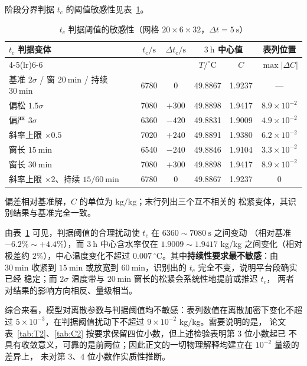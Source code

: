 \documentclass[12pt,a4paper]{ctexart}
\begin{document}
阶段分界判据 $t_c$ 的阈值敏感性见表~\ref{tab:app_tc}。

\begin{table}[H]
\centering
\small
\begin{tabular}{lccccc}
\toprule
$t_c$ 判据变体 & $t_c/\mathrm{s}$ & $\Delta t_c/\mathrm{s}$ &
\multicolumn{2}{c}{$3\ \mathrm{h}$ 中心值} & \multicolumn{1}{c}{表列位置} \\
\cmidrule(lr){4-5}\cmidrule(lr){6-6}
 & & & $T/^\circ\mathrm{C}$ & $C$ & $\max|\Delta C|$ \\
\midrule
基准 $2\sigma$ / 窗 $20\ \mathrm{min}$ / 持续 $30\ \mathrm{min}$ & 6780 & $0$ & 49.8867 & 1.9237 & — \\
偏松 $1.5\sigma$ & 7080 & $+300$ & 49.8898 & 1.9417 & $8.9\times10^{-2}$ \\
偏严 $3\sigma$ & 6360 & $-420$ & 49.8831 & 1.9009 & $4.9\times10^{-2}$ \\
斜率上限 $\times0.5$ & 7020 & $+240$ & 49.8891 & 1.9380 & $6.2\times10^{-2}$ \\
窗长 $15\ \mathrm{min}$ & 6540 & $-240$ & 49.8846 & 1.9104 & $3.3\times10^{-2}$ \\
窗长 $30\ \mathrm{min}$ & 7080 & $+300$ & 49.8898 & 1.9417 & $8.9\times10^{-2}$ \\
斜率上限 $\times2$、持续 $15/60\ \mathrm{min}$ & 6780 & $0$ & 49.8867 & 1.9237 & $0$ \\
\bottomrule
\end{tabular}

\vspace{2pt}
{\footnotesize 偏差相对基准解，$C$ 的单位为 $\mathrm{kg/kg}$；末行列出三个互不相关的
松紧变体，其识别结果与基准完全一致。}
\caption{$t_c$ 判据阈值的敏感性（网格 $20\times6\times32$，$\Delta t=5\ \mathrm{s}$）}
\label{tab:app_tc}
\end{table}

由表~\ref{tab:app_tc} 可见，判据阈值的合理扰动使 $t_c$ 在 $6360\sim7080\ \mathrm{s}$ 之间变动
（相对基准 $-6.2\%\sim+4.4\%$），而 $3\ \mathrm{h}$ 中心含水率仅在
$1.9009\sim1.9417$ kg/kg 之间变化（相对极差约 $2\%$），中心温度变化不超过
$0.007\ {}^\circ\mathrm{C}$。其中\textbf{持续性要求最不敏感}：由 $30\ \mathrm{min}$ 收紧到
$15\ \mathrm{min}$ 或放宽到 $60\ \mathrm{min}$，识别出的 $t_c$ 完全不变，说明平台段确实已经
稳定；而 $2\sigma$ 温度带与 $20\ \mathrm{min}$ 窗长的松紧会系统性地提前或推迟 $t_c$，
两者对结果的影响方向相反、量级相当。

综合来看，模型对离散参数与判据阈值均不敏感：表列数值在离散加密下变化不超过
$5\times10^{-3}$，在判据阈值扰动下不超过 $9\times10^{-2}$ kg/kg。需要说明的是，
论文表~\ref{tab:T2}、\ref{tab:C2} 按要求保留四位小数，但上述检验表明第 $3$ 位小数起已
不具有收敛意义，可靠的是前两位；因此正文的一切物理解释均建立在 $10^{-2}$ 量级的差异上，
未对第 $3$、$4$ 位小数作实质性推断。
\end{document}
